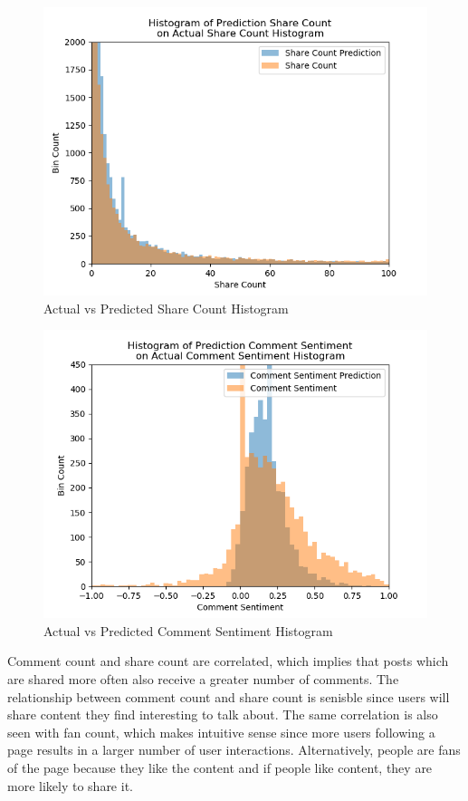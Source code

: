 \documentclass[mksc,blindrev]{informs3} %
\begin{document}
\begin{figure}
\centering
\includegraphics[width=\columnwidth]{images/Share_Count_Prediction_vs_Actual.png}
\caption{Actual vs Predicted Share Count Histogram}
\label{share_count_histogram}
\end{figure}

\begin{figure}
\centering
\includegraphics[width=\columnwidth]{images/Sentiment_Prediction_vs_Actual.png}
\caption{Actual vs Predicted Comment Sentiment Histogram}
\label{comment_sentiment_histogram}
\end{figure}


Comment count and share count are correlated, which implies that posts which are shared more often also receive a greater number of comments. The relationship between comment count and share count is senisble since users will share content they find interesting to talk about. The same correlation is also seen with fan count, which makes intuitive sense since more users following a page results in a larger number of user interactions. Alternatively, people are fans of the page because they like the content and if people like content, they are more likely to share it.
\end{document}
